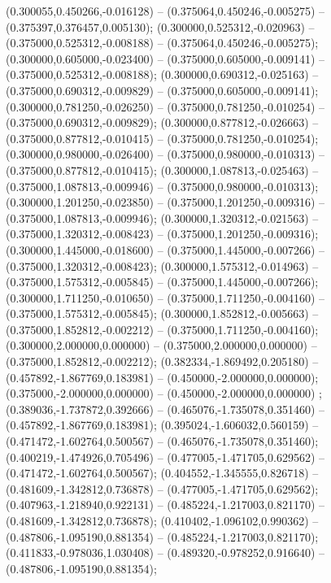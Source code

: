  (0.300055,0.450266,-0.016128) -- (0.375064,0.450246,-0.005275) -- (0.375397,0.376457,0.005130);
 (0.300000,0.525312,-0.020963) -- (0.375000,0.525312,-0.008188) -- (0.375064,0.450246,-0.005275);
 (0.300000,0.605000,-0.023400) -- (0.375000,0.605000,-0.009141) -- (0.375000,0.525312,-0.008188);
 (0.300000,0.690312,-0.025163) -- (0.375000,0.690312,-0.009829) -- (0.375000,0.605000,-0.009141);
 (0.300000,0.781250,-0.026250) -- (0.375000,0.781250,-0.010254) -- (0.375000,0.690312,-0.009829);
 (0.300000,0.877812,-0.026663) -- (0.375000,0.877812,-0.010415) -- (0.375000,0.781250,-0.010254);
 (0.300000,0.980000,-0.026400) -- (0.375000,0.980000,-0.010313) -- (0.375000,0.877812,-0.010415);
 (0.300000,1.087813,-0.025463) -- (0.375000,1.087813,-0.009946) -- (0.375000,0.980000,-0.010313);
 (0.300000,1.201250,-0.023850) -- (0.375000,1.201250,-0.009316) -- (0.375000,1.087813,-0.009946);
 (0.300000,1.320312,-0.021563) -- (0.375000,1.320312,-0.008423) -- (0.375000,1.201250,-0.009316);
 (0.300000,1.445000,-0.018600) -- (0.375000,1.445000,-0.007266) -- (0.375000,1.320312,-0.008423);
 (0.300000,1.575312,-0.014963) -- (0.375000,1.575312,-0.005845) -- (0.375000,1.445000,-0.007266);
 (0.300000,1.711250,-0.010650) -- (0.375000,1.711250,-0.004160) -- (0.375000,1.575312,-0.005845);
 (0.300000,1.852812,-0.005663) -- (0.375000,1.852812,-0.002212) -- (0.375000,1.711250,-0.004160);
 (0.300000,2.000000,0.000000) -- (0.375000,2.000000,0.000000) -- (0.375000,1.852812,-0.002212);
 (0.382334,-1.869492,0.205180) -- (0.457892,-1.867769,0.183981) -- (0.450000,-2.000000,0.000000);
 (0.375000,-2.000000,0.000000) -- (0.450000,-2.000000,0.000000) ;
 (0.389036,-1.737872,0.392666) -- (0.465076,-1.735078,0.351460) -- (0.457892,-1.867769,0.183981);
 (0.395024,-1.606032,0.560159) -- (0.471472,-1.602764,0.500567) -- (0.465076,-1.735078,0.351460);
 (0.400219,-1.474926,0.705496) -- (0.477005,-1.471705,0.629562) -- (0.471472,-1.602764,0.500567);
 (0.404552,-1.345555,0.826718) -- (0.481609,-1.342812,0.736878) -- (0.477005,-1.471705,0.629562);
 (0.407963,-1.218940,0.922131) -- (0.485224,-1.217003,0.821170) -- (0.481609,-1.342812,0.736878);
 (0.410402,-1.096102,0.990362) -- (0.487806,-1.095190,0.881354) -- (0.485224,-1.217003,0.821170);
 (0.411833,-0.978036,1.030408) -- (0.489320,-0.978252,0.916640) -- (0.487806,-1.095190,0.881354);
